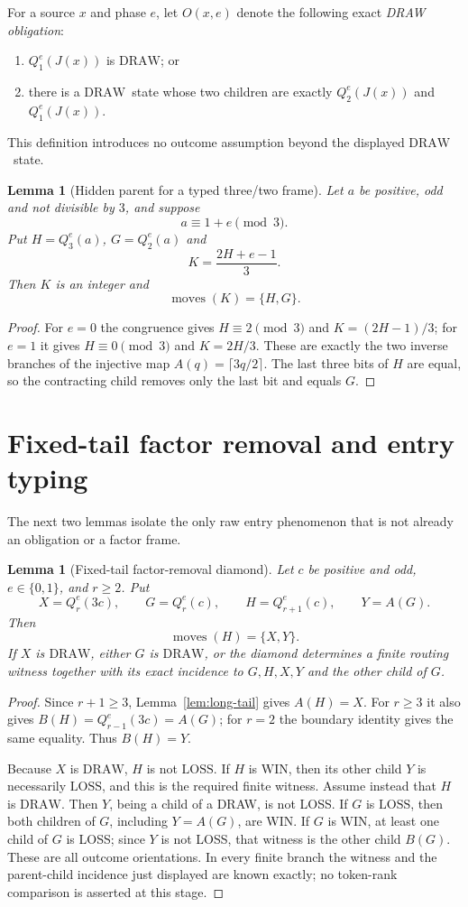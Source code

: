 \documentclass[11pt]{article}
\newtheorem{lemma}[theorem]{Lemma}
\newcommand{\WIN}{\ensuremath{\mathrm{WIN}}}
\newcommand{\LOSS}{\ensuremath{\mathrm{LOSS}}}
\newcommand{\DRAW}{\ensuremath{\mathrm{DRAW}}}
\newcommand{\Moves}{\operatorname{moves}}
\begin{document}
For a source $x$ and phase $e$, let $O(x,e)$ denote the following exact
\emph{DRAW obligation}:
\begin{enumerate}[label=(\alph*)]
\item $Q_1^e(J(x))$ is \DRAW; or
\item there is a \DRAW\ state whose two children are exactly
      $Q_2^e(J(x))$ and $Q_1^e(J(x))$.
\end{enumerate}
This definition introduces no outcome assumption beyond the displayed
\DRAW\ state.

\begin{lemma}[Hidden parent for a typed three/two frame]\label{lem:hidden-parent}
Let $a$ be positive, odd and not divisible by $3$, and suppose
\[
  a\equiv1+e\pmod3.
\]
Put $H=Q_3^e(a)$, $G=Q_2^e(a)$ and
\[
  K=\frac{2H+e-1}{3}.
\]
Then $K$ is an integer and
\[
  \Moves(K)=\{H,G\}.
\]
\end{lemma}

\begin{proof}
For $e=0$ the congruence gives $H\equiv2\pmod3$ and
$K=(2H-1)/3$; for $e=1$ it gives $H\equiv0\pmod3$ and $K=2H/3$.
These are exactly the two inverse branches of the injective map
$A(q)=\lceil3q/2\rceil$. The last three bits of $H$ are equal, so the
contracting child removes only the last bit and equals $G$.
\end{proof}

\section{Fixed-tail factor removal and entry typing}

The next two lemmas isolate the only raw entry phenomenon that is not already
an obligation or a factor frame.

\begin{lemma}[Fixed-tail factor-removal diamond]\label{lem:fixed-tail-factor}
Let $c$ be positive and odd, $e\in\{0,1\}$, and $r\ge2$. Put
\[
  X=Q_r^e(3c),\qquad G=Q_r^e(c),\qquad H=Q_{r+1}^e(c),\qquad Y=A(G).
\]
Then
\[
  \Moves(H)=\{X,Y\}.
\]
If $X$ is \DRAW, either $G$ is \DRAW, or the diamond determines a finite
routing witness together with its exact incidence to $G,H,X,Y$ and the other
child of $G$.
\end{lemma}

\begin{proof}
Since $r+1\ge3$, Lemma~\ref{lem:long-tail} gives $A(H)=X$. For $r\ge3$ it
also gives $B(H)=Q_{r-1}^e(3c)=A(G)$; for $r=2$ the boundary identity gives
the same equality. Thus $B(H)=Y$.

Because $X$ is \DRAW, $H$ is not \LOSS. If $H$ is \WIN, then its other
child $Y$ is necessarily \LOSS, and this is the required finite witness.
Assume instead that $H$ is \DRAW. Then $Y$, being a child of a DRAW, is not
LOSS. If $G$ is \LOSS, then both children of $G$, including $Y=A(G)$, are
WIN. If $G$ is \WIN, at least one child of $G$ is LOSS; since $Y$ is not LOSS,
that witness is the other child $B(G)$. These are all outcome orientations.
In every finite branch the witness and the parent-child incidence just
displayed are known exactly; no token-rank comparison is asserted at this
stage.
\end{proof}
\end{document}
